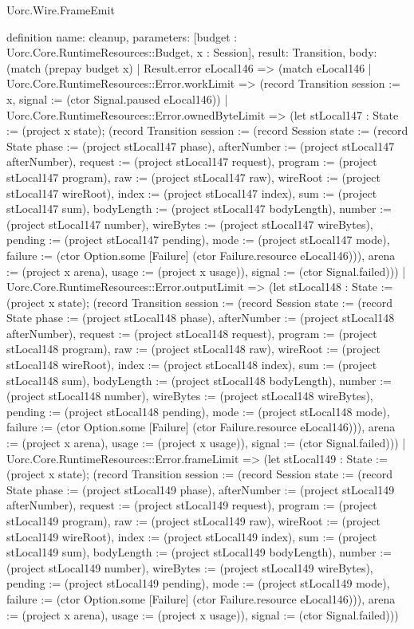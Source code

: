 \begin{lexlean}{Uorc.Wire.FrameEmit}
\begin{semanticmodule}
definition{
  name: cleanup,
  parameters: [budget : Uorc.Core.RuntimeResources::Budget, x : Session],
  result: Transition,
  body: (match (prepay budget x)
    | Result.error eLocal146 => (match eLocal146
      | Uorc.Core.RuntimeResources::Error.workLimit => (record Transition {session := x, signal := (ctor Signal.paused eLocal146)})
      | Uorc.Core.RuntimeResources::Error.ownedByteLimit => (let stLocal147 : State := (project x state); (record Transition {session := (record Session {state := (record State {phase := (project stLocal147 phase), afterNumber := (project stLocal147 afterNumber), request := (project stLocal147 request), program := (project stLocal147 program), raw := (project stLocal147 raw), wireRoot := (project stLocal147 wireRoot), index := (project stLocal147 index), sum := (project stLocal147 sum), bodyLength := (project stLocal147 bodyLength), number := (project stLocal147 number), wireBytes := (project stLocal147 wireBytes), pending := (project stLocal147 pending), mode := (project stLocal147 mode), failure := (ctor Option.some [Failure] (ctor Failure.resource eLocal146))}), arena := (project x arena), usage := (project x usage)}), signal := (ctor Signal.failed)}))
      | Uorc.Core.RuntimeResources::Error.outputLimit => (let stLocal148 : State := (project x state); (record Transition {session := (record Session {state := (record State {phase := (project stLocal148 phase), afterNumber := (project stLocal148 afterNumber), request := (project stLocal148 request), program := (project stLocal148 program), raw := (project stLocal148 raw), wireRoot := (project stLocal148 wireRoot), index := (project stLocal148 index), sum := (project stLocal148 sum), bodyLength := (project stLocal148 bodyLength), number := (project stLocal148 number), wireBytes := (project stLocal148 wireBytes), pending := (project stLocal148 pending), mode := (project stLocal148 mode), failure := (ctor Option.some [Failure] (ctor Failure.resource eLocal146))}), arena := (project x arena), usage := (project x usage)}), signal := (ctor Signal.failed)}))
      | Uorc.Core.RuntimeResources::Error.frameLimit => (let stLocal149 : State := (project x state); (record Transition {session := (record Session {state := (record State {phase := (project stLocal149 phase), afterNumber := (project stLocal149 afterNumber), request := (project stLocal149 request), program := (project stLocal149 program), raw := (project stLocal149 raw), wireRoot := (project stLocal149 wireRoot), index := (project stLocal149 index), sum := (project stLocal149 sum), bodyLength := (project stLocal149 bodyLength), number := (project stLocal149 number), wireBytes := (project stLocal149 wireBytes), pending := (project stLocal149 pending), mode := (project stLocal149 mode), failure := (ctor Option.some [Failure] (ctor Failure.resource eLocal146))}), arena := (project x arena), usage := (project x usage)}), signal := (ctor Signal.failed)}))
}
\end{semanticmodule}
\end{lexlean}
